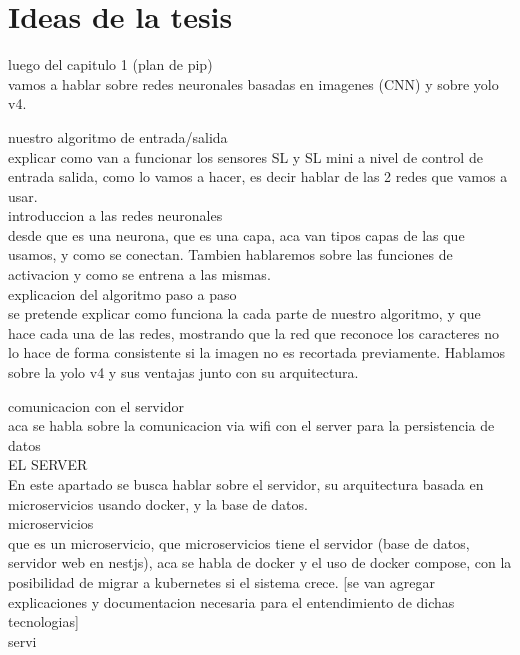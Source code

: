 \chapter{Ideas de la tesis}

luego del capitulo 1 (plan de pip)\\

vamos a hablar sobre redes neuronales basadas en imagenes (CNN) y sobre yolo v4.

nuestro algoritmo de entrada/salida \\

explicar como van a funcionar los sensores SL y SL mini a nivel de control de entrada salida,
como lo vamos a hacer, es decir hablar de las 2 redes que vamos a usar. \\

introduccion a las redes neuronales \\
desde que es una neurona, que es una capa, aca van tipos capas de las que usamos, y como se conectan. Tambien hablaremos sobre las funciones de activacion y como se entrena a las mismas. \\

explicacion del algoritmo paso a paso \\

se pretende explicar como funciona la cada parte de nuestro algoritmo, y que hace cada una de las redes, mostrando que la red que reconoce los caracteres no lo hace de forma consistente si la imagen no es recortada previamente. Hablamos sobre la yolo v4 y sus ventajas junto con su arquitectura.

comunicacion con el servidor \\

aca se habla sobre la comunicacion via wifi con el server para la persistencia de datos \\

EL SERVER \\

En este apartado se busca hablar sobre el servidor, su arquitectura basada en microservicios usando docker, y la base de datos. \\

microservicios \\

que es un microservicio, que microservicios tiene el servidor (base de datos, servidor web en nestjs), aca se habla de docker y el uso de docker compose, con la posibilidad de migrar a kubernetes si el sistema crece. [se van agregar explicaciones y documentacion necesaria para el 
entendimiento de dichas tecnologias] \\

servi


